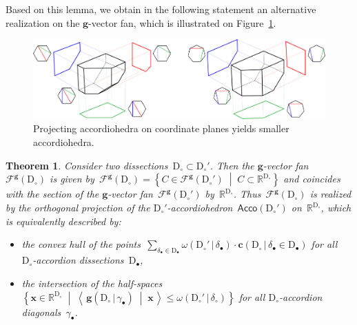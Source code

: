 \documentclass{amsart}
\newtheorem{theorem}{Theorem}%
\theoremstyle{definition}
\newcommand{\R}{\mathbb{R}} %
\renewcommand{\b}[1]{\mathbf{#1}} %
\newcommand{\set}[2]{\left\{ #1 \;\middle|\; #2 \right\}} %
\newcommand{\dotprod}[2]{\left\langle \, #1 \; \middle| \; #2 \, \right\rangle} %
\newcommand{\Acco}{\mathsf{Acco}} %
\newcommand{\fref}[1]{Figure~\ref{#1}} %
\newcommand{\dissection}{\mathrm{D}} %
\newcommand{\gvector}[2]{\mathbf{g}(#1 \,|\, #2)} %
\newcommand{\gvectorFan}{\mathcal{F}^\mathbf{g}} %
\newcommand{\cvector}[3]{\mathbf{c}(#1  \,|\, #3 \in #2)} %
\newcommand{\rhs}[2]{\omega(#1 \,|\, #2)} %
\begin{document}
Based on this lemma, we obtain in the following statement an alternative realization on the $\b{g}$-vector fan, which is illustrated on \fref{fig:exmAccordiohedronProjected}.

\begin{figure}[b]
	\capstart
	\centerline{\includegraphics[scale=.28]{exmAccordiohedronProjected}}
	\caption{Projecting accordiohedra on coordinate planes yields smaller accordiohedra.}
	\label{fig:exmAccordiohedronProjected}
\end{figure}

\begin{theorem}
\label{thm:sectionProjection}
Consider two dissections~$\dissection_\circ \subset \dissection_\circ'$. Then the $\b{g}$-vector fan~$\gvectorFan(\dissection_\circ)$ is given by~$\gvectorFan(\dissection_\circ) = \set{C \in \gvectorFan(\dissection_\circ')}{C \subset \R^{\dissection_\circ}}$ and coincides with the section of the $\b{g}$-vector fan~$\gvectorFan(\dissection_\circ')$ by~$\R^{\dissection_\circ}$. Thus~$\gvectorFan(\dissection_\circ)$ is realized by the orthogonal projection of the $\dissection_\circ'$-accordiohedron~$\Acco(\dissection_\circ')$ on~$\R^{\dissection_\circ}$, which is equivalently described by:
\begin{itemize}
\item the convex hull of the points~$\sum_{\delta_\bullet \in \dissection_\bullet} \rhs{\dissection_\circ'}{\delta_\bullet} \cdot \cvector{\dissection_\circ}{\dissection_\bullet}{\delta_\bullet}$ for all~$\dissection_\circ$-accordion dissections~$\dissection_\bullet$,
\item the intersection of the half-spaces~$\set{\b{x} \in \R^{\dissection_\circ}}{\dotprod{\gvector{\dissection_\circ}{\gamma_\bullet}}{\b{x}} \le \rhs{\dissection_\circ'}{\delta_\circ}}$ for all \mbox{$\dissection_\circ$-accor}\-dion diagonals~$\gamma_\bullet$.
\end{itemize}
\end{theorem}

\end{document}

